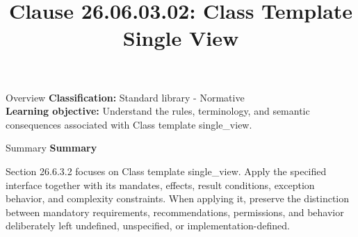 \documentclass[10pt,letterpaper]{article}
\title{Clause 26.06.03.02: Class Template Single View}
\author{}
\date{}
\begin{document}
\maketitle
\begin{CornellOverviewBox}{Overview}
\textbf{Classification:} Standard library - Normative\\[2pt]
\textbf{Learning objective:} Understand the rules, terminology, and semantic consequences associated with Class template single\_view.
\end{CornellOverviewBox}\begin{CornellSummaryBox}{Summary}
{\sffamily\bfseries\color{Accent} Summary}\par\vspace{3pt}Section 26.6.3.2 focuses on Class template single\_view. Apply the specified interface together with its mandates, effects, result conditions, exception behavior, and complexity constraints. When applying it, preserve the distinction between mandatory requirements, recommendations, permissions, and behavior deliberately left undefined, unspecified, or implementation-defined.
\end{CornellSummaryBox}
\end{document}
